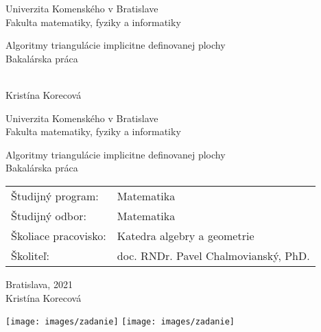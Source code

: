 \documentclass[12pt, twoside]{book}
\def\mfrok{2021}
\def\mfnazov{Algoritmy triangulácie implicitne definovanej plochy}
\def\mftyp{Bakalárska práca}
\def\mfautor{Kristína Korecová}
\def\mfskolitel{doc. RNDr. Pavel Chalmovianský, PhD. }
\def\mfkonzultant{tit. Meno Priezvisko, tit. }
\def\mfmiesto{Bratislava, \mfrok}
\def\mfodbor{ Matematika }
\def\program{ Matematika }
\def\mfpracovisko{ Katedra algebry a geometrie }
\begin{document}
     
\frontmatter


\thispagestyle{empty}

\begin{center}
\sc\large
Univerzita Komenského v Bratislave\\
Fakulta matematiky, fyziky a informatiky

\vfill

{\LARGE\mfnazov}\\
\mftyp
\end{center}

\vfill

{\sc\large 
\noindent \mfrok\\
\mfautor
}

\cleardoublepage


\thispagestyle{empty}
\noindent

\begin{center}
\sc  
\large
Univerzita Komenského v Bratislave\\
Fakulta matematiky, fyziky a informatiky

\vfill

{\LARGE\mfnazov}\\
\mftyp
\end{center}

\vfill

\noindent
\begin{tabular}{ll}
Študijný program: & \program \\
Študijný odbor: & \mfodbor \\
Školiace pracovisko: & \mfpracovisko \\
Školiteľ: & \mfskolitel \\
\end{tabular}

\vfill


\noindent \mfmiesto\\
\mfautor

\cleardoublepage



\newpage 
\thispagestyle{empty}
\hspace{-2cm}\texttt{[image: images/zadanie]}
\hspace{-2cm}\texttt{[image: images/zadanie]}
\end{document}
